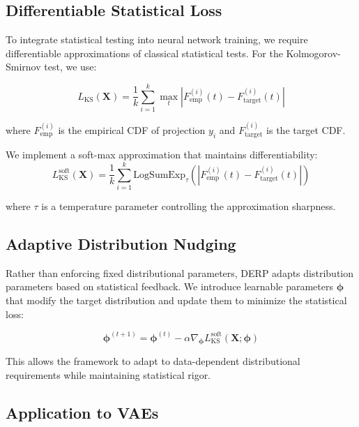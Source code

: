 \documentclass{article}
\begin{document}
\subsection{Differentiable Statistical Loss}

To integrate statistical testing into neural network training, we require differentiable approximations of classical statistical tests. For the Kolmogorov-Smirnov test, we use:

\begin{equation}
L_{\text{KS}}(\mathbf{X}) = \frac{1}{k} \sum_{i=1}^k \max_t |F_{\text{emp}}^{(i)}(t) - F_{\text{target}}^{(i)}(t)|
\end{equation}

where $F_{\text{emp}}^{(i)}$ is the empirical CDF of projection $y_i$ and $F_{\text{target}}^{(i)}$ is the target CDF.

We implement a soft-max approximation that maintains differentiability:
\begin{equation}
L_{\text{KS}}^{\text{soft}}(\mathbf{X}) = \frac{1}{k} \sum_{i=1}^k \text{LogSumExp}_{\tau}(|F_{\text{emp}}^{(i)}(t) - F_{\text{target}}^{(i)}(t)|)
\end{equation}

where $\tau$ is a temperature parameter controlling the approximation sharpness.

\subsection{Adaptive Distribution Nudging}

Rather than enforcing fixed distributional parameters, DERP adapts distribution parameters based on statistical feedback. We introduce learnable parameters $\boldsymbol{\phi}$ that modify the target distribution and update them to minimize the statistical loss:

\begin{equation}
\boldsymbol{\phi}^{(t+1)} = \boldsymbol{\phi}^{(t)} - \alpha \nabla_{\boldsymbol{\phi}} L_{\text{KS}}^{\text{soft}}(\mathbf{X}; \boldsymbol{\phi})
\end{equation}

This allows the framework to adapt to data-dependent distributional requirements while maintaining statistical rigor.

\subsection{Application to VAEs}
\end{document}
